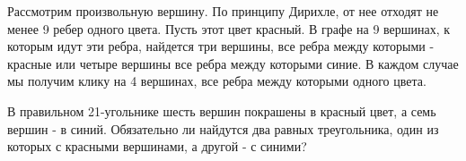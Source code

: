 \documentclass[11pt, a4paper]{template}
\begin{document}
\begin{solution}
Рассмотрим произвольную вершину. По принципу Дирихле, от нее отходят не менее 9 ребер одного цвета. Пусть этот цвет красный. В графе на 9 вершинах, к которым идут эти ребра, найдется три вершины, все ребра между которыми - красные или четыре вершины все ребра между которыми синие. В каждом случае мы получим клику на 4 вершинах, все ребра между которыми одного цвета.  
\end{solution}

\begin{exercise}
В правильном 21-угольнике шесть вершин покрашены в красный цвет, а семь вершин - в синий. Обязательно ли найдутся два равных треугольника, один из которых с красными вершинами, а другой - с синими?
\end{exercise}
\end{document}
